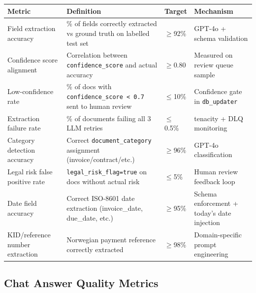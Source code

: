 \documentclass[12pt,a4paper]{article}
\newcommand{\codeinline}[1]{\texttt{\small\color{NordicBlue}#1}}
\begin{document}
\begin{tabularx}{\textwidth}{lXll}
\toprule
\textbf{Metric} & \textbf{Definition} & \textbf{Target} & \textbf{Mechanism} \\
\midrule
Field extraction accuracy & \% of fields correctly extracted vs ground truth on labelled test set & $\geq$92\% & GPT-4o + schema validation \\
Confidence score alignment & Correlation between \codeinline{confidence\_score} and actual accuracy & $\geq$0.80 & Measured on review queue sample \\
Low-confidence rate & \% of docs with \codeinline{confidence\_score < 0.7} sent to human review & $\leq$10\% & Confidence gate in \codeinline{db\_updater} \\
Extraction failure rate & \% of documents failing all 3 LLM retries & $\leq$0.5\% & tenacity + DLQ monitoring \\
Category detection accuracy & Correct \codeinline{document\_category} assignment (invoice/contract/etc.) & $\geq$96\% & GPT-4o classification \\
Legal risk false positive rate & \codeinline{legal\_risk\_flag=true} on docs without actual risk & $\leq$5\% & Human review feedback loop \\
Date field accuracy & Correct ISO-8601 date extraction (invoice\_date, due\_date, etc.) & $\geq$95\% & Schema enforcement + today's date injection \\
KID/reference number extraction & Norwegian payment reference correctly extracted & $\geq$98\% & Domain-specific prompt engineering \\
\bottomrule
\end{tabularx}

\subsection{Chat Answer Quality Metrics}
\end{document}
